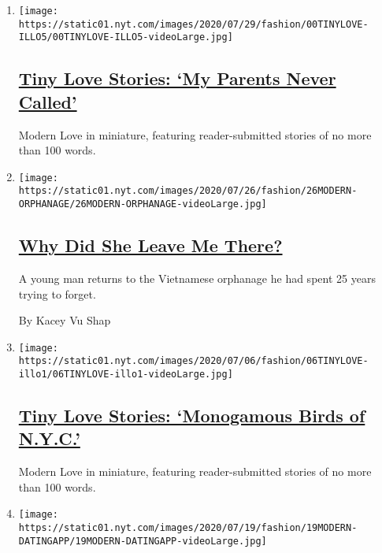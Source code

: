 \begin{enumerate}
\def\labelenumi{\arabic{enumi}.}
\item
  \texttt{[image: https://static01.nyt.com/images/2020/07/29/fashion/00TINYLOVE-ILLO5/00TINYLOVE-ILLO5-videoLarge.jpg]}

  \hypertarget{tiny-love-stories-my-parents-never-called-1}{%
  \subsection{\texorpdfstring{\href{/2020/07/28/style/tiny-modern-love-stories-coronavirus-my-parents-never-called.html}{Tiny
  Love Stories: `My Parents Never
  Called'}}{Tiny Love Stories: `My Parents Never Called'}}\label{tiny-love-stories-my-parents-never-called-1}}

  Modern Love in miniature, featuring reader-submitted stories of no
  more than 100 words.
\item
  \texttt{[image: https://static01.nyt.com/images/2020/07/26/fashion/26MODERN-ORPHANAGE/26MODERN-ORPHANAGE-videoLarge.jpg]}

  \hypertarget{why-did-she-leave-me-there}{%
  \subsection{\texorpdfstring{\href{/2020/07/24/style/modern-love-adoption-vietnam-why-did-she-leave-me-there.html}{Why
  Did She Leave Me
  There?}}{Why Did She Leave Me There?}}\label{why-did-she-leave-me-there}}

  A young man returns to the Vietnamese orphanage he had spent 25 years
  trying to forget.

  By Kacey Vu Shap
\item
  \texttt{[image: https://static01.nyt.com/images/2020/07/06/fashion/06TINYLOVE-illo1/06TINYLOVE-illo1-videoLarge.jpg]}

  \hypertarget{tiny-love-stories-monogamous-birds-of-nyc}{%
  \subsection{\texorpdfstring{\href{/2020/07/21/style/tiny-modern-love-stories-coronavirus-monogamous-birds-of-nyc.html}{Tiny
  Love Stories: `Monogamous Birds of
  N.Y.C.'}}{Tiny Love Stories: `Monogamous Birds of N.Y.C.'}}\label{tiny-love-stories-monogamous-birds-of-nyc}}

  Modern Love in miniature, featuring reader-submitted stories of no
  more than 100 words.
\item
  \texttt{[image: https://static01.nyt.com/images/2020/07/19/fashion/19MODERN-DATINGAPP/19MODERN-DATINGAPP-videoLarge.jpg]}


\end{enumerate}
